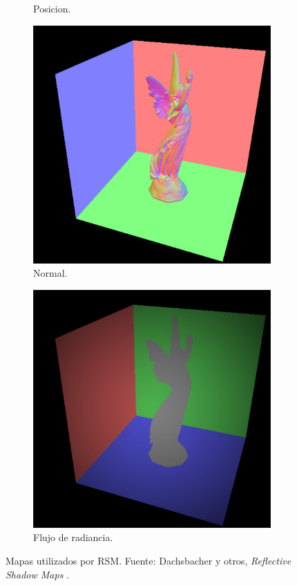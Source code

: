 \begin{figure}[H]
\begin{subfigure}[t]{.24\linewidth}
		\caption*{Posicion.}
	\end{subfigure}
	\begin{subfigure}[t]{.24\linewidth}
		\centering
		\captionsetup{justification=centering}
		\includegraphics[width=\linewidth]{media/rsmn.png}
		\caption*{Normal.}
	\end{subfigure}
	\begin{subfigure}[t]{.24\linewidth}
		\centering
		\captionsetup{justification=centering}
		\includegraphics[width=\linewidth]{media/rsmf.png}
		\caption*{Flujo de radiancia.}
	\end{subfigure}
	\caption{Mapas utilizados por \ac{RSM}. Fuente: Dachsbacher y otros, \emph{Reflective Shadow Maps} \cite{Dachsbacher:2005}.}
	\label{fig:rsm_fbo}
\end{figure}

